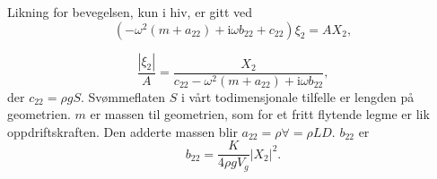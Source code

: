 Likning for bevegelsen, kun i hiv, er gitt ved
\begin{equation}
( - \omega^2(m+a_{22}) + \mathrm{i}\omega b_{22}+ c_{22})\xi_2 = AX_2, 
\end{equation}

\begin{equation}
\frac{|\xi_2|}{A} = \frac{X_2}{c_{22} - \omega^2(m+a_{22}) + \mathrm{i}\omega b_{22}}, 
\end{equation}
der $c_{22} = \rho g S$. Svømmeflaten $S$ i vårt todimensjonale tilfelle er lengden på geometrien. $m$ er massen til geometrien, som for et fritt flytende legme er lik oppdriftskraften. Den adderte massen blir $a_{22} = \rho \forall = \rho LD$. $b_{22}$ er
\begin{equation}
b_{22} = \frac{K }{4\rho g V_g}|X_2|^2. 
\end{equation}